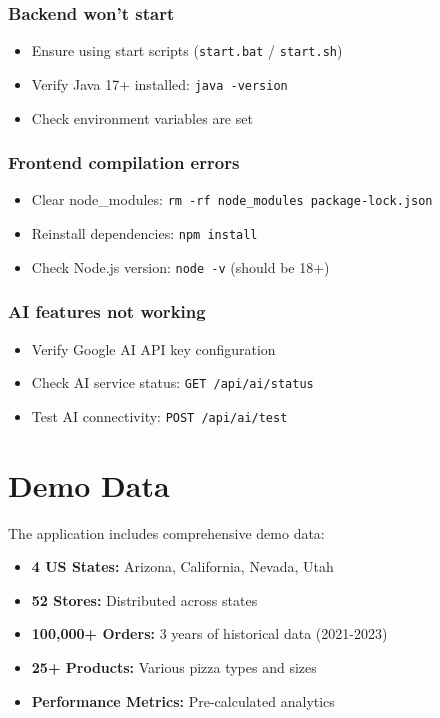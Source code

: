 \documentclass[11pt,a4paper]{article}
\begin{document}
\subsubsection{Backend won't start}
\begin{itemize}[leftmargin=*]
    \item Ensure using start scripts (\texttt{start.bat} / \texttt{start.sh})
    \item Verify Java 17+ installed: \texttt{java -version}
    \item Check environment variables are set
\end{itemize}

\subsubsection{Frontend compilation errors}
\begin{itemize}[leftmargin=*]
    \item Clear node\_modules: \texttt{rm -rf node\_modules package-lock.json}
    \item Reinstall dependencies: \texttt{npm install}
    \item Check Node.js version: \texttt{node -v} (should be 18+)
\end{itemize}

\subsubsection{AI features not working}
\begin{itemize}[leftmargin=*]
    \item Verify Google AI API key configuration
    \item Check AI service status: \texttt{GET /api/ai/status}
    \item Test AI connectivity: \texttt{POST /api/ai/test}
\end{itemize}

\section{Demo Data}

The application includes comprehensive demo data:
\begin{itemize}[leftmargin=*]
    \item \textbf{4 US States:} Arizona, California, Nevada, Utah
    \item \textbf{52 Stores:} Distributed across states
    \item \textbf{100,000+ Orders:} 3 years of historical data (2021-2023)
    \item \textbf{25+ Products:} Various pizza types and sizes
    \item \textbf{Performance Metrics:} Pre-calculated analytics
\end{itemize}
\end{document}
